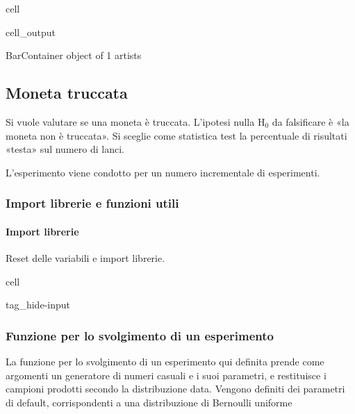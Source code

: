 \documentclass[letterpaper,10pt,italian]{jupyterBook}
\begin{document}
\begin{sphinxuseclass}{cell}
\begin{sphinxVerbatimOutput}
\begin{sphinxuseclass}{cell_output}
\begin{sphinxVerbatim}[commandchars=\\\{\}]
\PYGZlt{}BarContainer object of 1 artists\PYGZgt{}
\end{sphinxVerbatim}

\noindent{}

\end{sphinxuseclass}\end{sphinxVerbatimOutput}

\end{sphinxuseclass}
\sphinxstepscope


\subsection{Moneta truccata}
\label{\detokenize{ch/statistics/test-fisher-coin-2:moneta-truccata}}\label{\detokenize{ch/statistics/test-fisher-coin-2::doc}}
\sphinxAtStartPar
Si vuole valutare se una moneta è truccata. L’ipotesi nulla \(\text{H}_0\) da falsificare è «la moneta non è truccata». Si sceglie come statistica test la percentuale di risultati «testa» sul numero di lanci.

\sphinxAtStartPar
L’esperimento viene condotto per un numero incrementale di esperimenti.


\subsubsection{Import librerie e funzioni utili}
\label{\detokenize{ch/statistics/test-fisher-coin-2:import-librerie-e-funzioni-utili}}

\paragraph{Import librerie}
\label{\detokenize{ch/statistics/test-fisher-coin-2:import-librerie}}
\sphinxAtStartPar
Reset delle variabili e import librerie.

\begin{sphinxuseclass}{cell}
\begin{sphinxuseclass}{tag_hide-input}
\end{sphinxuseclass}
\end{sphinxuseclass}

\subsubsection{Funzione per lo svolgimento di un esperimento}
\label{\detokenize{ch/statistics/test-fisher-coin-2:funzione-per-lo-svolgimento-di-un-esperimento}}
\sphinxAtStartPar
La funzione per lo svolgimento di un esperimento qui definita prende come argomenti un generatore di numeri casuali e i suoi parametri, e restituisce i campioni prodotti secondo la distribuzione data. Vengono definiti dei parametri di default, corrispondenti a una distribuzione di Bernoulli uniforme
\end{document}
